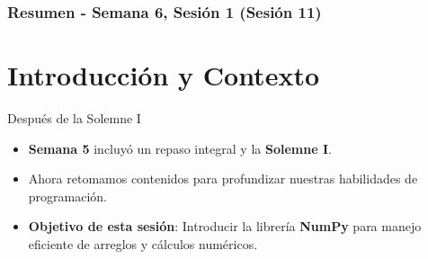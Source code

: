 \documentclass[10pt]{beamer}
\begin{document}
\myfront{}

\begin{frame}
  \titlepage
\end{frame}

\begin{frame}
  \frametitle{Resumen - Semana 6, Sesión 1 (Sesión 11)}
  \tableofcontents
\end{frame}


\section{Introducción y Contexto}

\begin{frame}{Después de la Solemne I}
  \begin{itemize}
    \item \textbf{Semana 5} incluyó un repaso integral y la \textbf{Solemne I}.
    \item Ahora retomamos contenidos para profundizar nuestras habilidades de programación.
    \item \textbf{Objetivo de esta sesión}: Introducir la librería \textbf{NumPy} para manejo eficiente de arreglos y cálculos numéricos.
  \end{itemize}
\end{frame}
\end{document}
